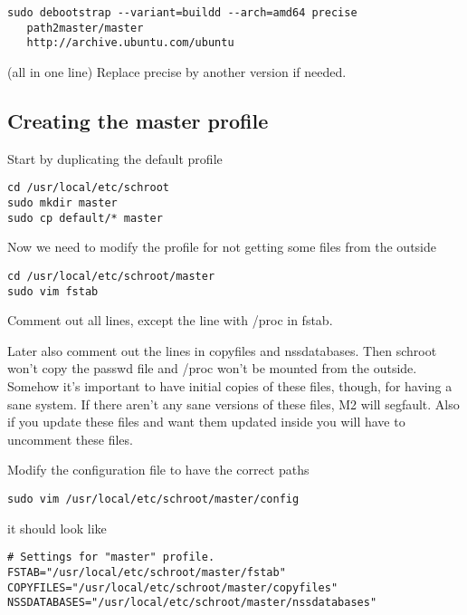 \documentclass[a4paper]{book}
\begin{document}
\begin{verbatim}
sudo debootstrap --variant=buildd --arch=amd64 precise 
   path2master/master 
   http://archive.ubuntu.com/ubuntu
\end{verbatim}

(all in one line)
Replace precise by another version if needed.


\subsection{Creating the master profile}

Start by duplicating the default profile

\begin{verbatim}
cd /usr/local/etc/schroot
sudo mkdir master
sudo cp default/* master
\end{verbatim}

Now we need to modify the profile for not getting some files from the outside

\begin{verbatim}
cd /usr/local/etc/schroot/master
sudo vim fstab
\end{verbatim}

Comment out all lines, except the line with /proc in fstab. 

Later also comment out the lines in copyfiles and nssdatabases.  Then schroot
won't copy the passwd file and /proc won't be mounted from the outside.
Somehow it's important to have initial copies of these files, though, for
having a sane system. If there aren't any sane versions of these files, M2 will
segfault.  Also if you update these files and want them updated inside you will
have to uncomment these files.

Modify the configuration file to have the correct paths

\begin{verbatim}
sudo vim /usr/local/etc/schroot/master/config
\end{verbatim}

it should look like

\begin{verbatim}
# Settings for "master" profile.
FSTAB="/usr/local/etc/schroot/master/fstab"
COPYFILES="/usr/local/etc/schroot/master/copyfiles"
NSSDATABASES="/usr/local/etc/schroot/master/nssdatabases"
\end{verbatim}
\end{document}
